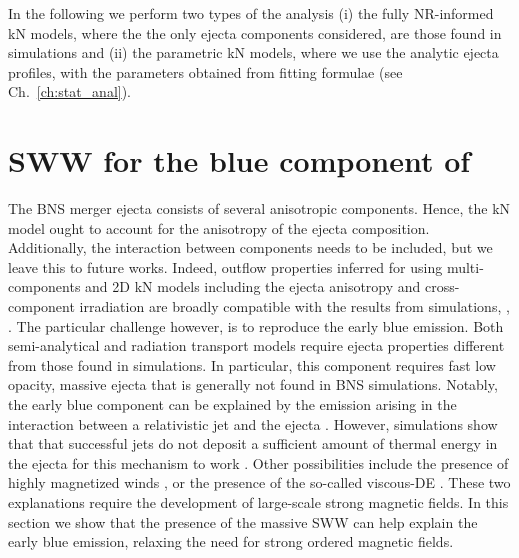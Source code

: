 
In the following we perform two types of the analysis (i) the fully \ac{NR}-informed \ac{kN} models, where the the only ejecta components considered, are those found in simulations and (ii) the parametric \ac{kN} models, where we use the analytic ejecta profiles, with the parameters obtained from fitting formulae (see Ch.~\ref{ch:stat_anal}).


\section{\ac{SWW} for the blue component of \AT{}}

The \ac{BNS} merger ejecta consists of several anisotropic components.
Hence, the \ac{kN} model ought to account for the anisotropy of the ejecta composition. Additionally, the interaction between components needs to be included, but we leave this to future works.
Indeed, outflow properties inferred for \AT{} using multi-components and 2D \ac{kN} models including the ejecta anisotropy and cross-component irradiation are broadly compatible with the results from simulations, \eg, \citep{Perego:2017wtu,Kawaguchi:2018ptg}.
The particular challenge however, is to reproduce the early blue emission. 
Both semi-analytical and radiation transport
models require ejecta properties different from those found in
simulations. In particular, 
this component requires fast low opacity, massive ejecta \citep{Fahlman:2018llv} that is generally 
not found in \ac{BNS} simulations.
Notably, the early blue component can be explained by the emission arising 
in the interaction between a relativistic jet and the ejecta
\citep{Lazzati:2016yxl,Bromberg:2017crh,Piro:2017ayh}.
However, simulations show that that successful jets do not deposit a sufficient amount of thermal energy in the ejecta for this mechanism to work \citep{Duffell:2018iig}. 
Other possibilities include the presence of highly magnetized winds \citep{Metzger:2018uni,Fernandez:2018kax},
or the presence of the so-called viscous-\ac{DE} \citep{Radice:2018ghv}.
These two explanations require the development of large-scale strong magnetic fields.
In this section we show that the presence of the massive \ac{SWW} can help explain the early blue emission, relaxing the need for strong ordered magnetic fields. 

